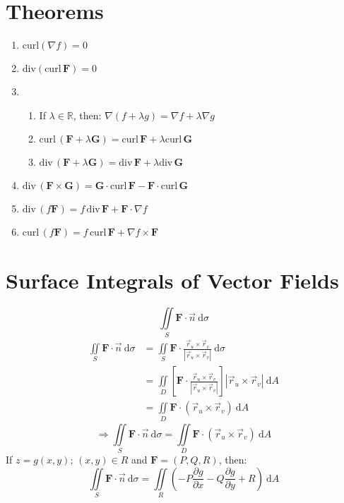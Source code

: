\documentclass[12pt, fleqn]{book}
\newcommand{\D}{\mathrm{d}}
\newcommand{\iis}{\iint\limits_S}
\newcommand{\rutrv}{\vec{r}_u \times \vec{r}_v\right}
\newcommand{\F}{\mathbf{F}}
\newcommand{\G}{\mathbf{G}}
\newcommand{\Curl}{\mathrm{curl}}
\newcommand{\Div}{\mathrm{div}}
\newcommand{\xy}{(x, y)}
\newcommand{\rond}[2]{\frac{\partial #1}{\partial #2}}
\begin{document}
     	\section{Theorems}
     		\begin{enumerate}
     			\item $\Curl(\nabla f) = 0$
     			\item $\Div(\Curl \, \F) = 0$
                \item \begin{enumerate}
     					\item If $\lambda \in \mathbb{R}$, then: $\nabla(f + \lambda g) = \nabla f + \lambda \nabla g$
		     			\item $\Curl \, (\F + \lambda \G) = \Curl \, \F + \lambda\Curl \, \G$
		     			\item $\Div \, (\F + \lambda \G) = \Div \, \F + \lambda\Div \, \G$
     			\end{enumerate}
     			\item $\Div \, (\F \times \G) = \G \cdot \Curl \, \F - \F \cdot \Curl \, \G$
     			\item $\Div \, (f \F) = f \, \Div \, \F + \F \cdot \nabla f$
     			\item $\Curl \, (f \F) = f \, \Curl \, \F + \nabla f \times \F$
     		\end{enumerate}
     	\section{Surface Integrals of Vector Fields}
     		\begin{equation}
     			\iis \F \cdot \vec{n} \ \D \sigma
     		\end{equation}
     		\begin{equation*}
     			\begin{split}
     				\iis \F \cdot \vec{n} \ \D \sigma
     				&  = \iis \F \cdot \frac{\vec{r}_u \times \vec{r}_v}{\left|\rutrv|} \ \D \sigma \\
     				& = \iint\limits_D \left[\F \cdot \frac{\vec{r}_u \times \vec{r}_v}{\left|\rutrv|}\right] \left|\rutrv| \ \D A \\
     				& = \iint\limits_D \F \cdot \left(\rutrv) \ \D A
     			\end{split}
     		\end{equation*}
     	    \begin{equation}
     	    	\Rightarrow 
     	    	\iis \F \cdot \vec{n} \ \D \sigma = \iint\limits_D \F \cdot \left(\rutrv) \ \D A
     	    \end{equation}
     		If $z = g\xy; \, \xy \in R$ and $\F = (P, Q, R)$, then:
     		\begin{equation}
     			\iis \F \cdot \vec{n} \ \D \sigma = 
     			\iint\limits_R \left(-P \rond{g}{x} - Q\rond{g}{y} + R\right) \ \D A
     		\end{equation}
     	
\end{document}
